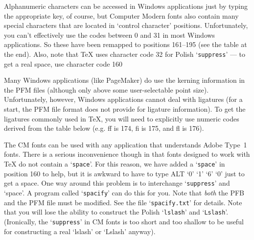 

Alphanumeric characters can be accessed in Windows applications just by
typing the appropriate key, of course, but Computer Modern fonts also contain
many special characters that are located in `control character' positions.
Unfortunately, you can't effectively use the codes between 0 and 31 in most
Windows applications.  
So these have been remapped to positions 161--195 (see the table at the end).  
Also, note that {\TeX} uses character code 32 for Polish
`{\tt suppress}' %
--- to get a real space, use character code 160

Many Windows applications (like PageMaker) do use the kerning
information in the PFM files (although only above some user-selectable
point size).  
Unfortunately, however, Windows applications cannot deal with ligatures
(for a start, the PFM file format does not provide for ligature information).
To get the ligatures commonly used in {\TeX}, you will need to
explicitly use numeric codes derived from the table below 
(e.g. ff is 174, fi is 175, and fl is 176). 


The CM fonts can be used with any application that understands 
Adobe Type~1 fonts. 
There is a serious inconvenience though in that %
fonts designed to work with {\TeX} 
do not contain a `{\tt space}'.  
For this reason, we have added a `{\tt space}' in position 160 to help,
but it is awkward to have to type ALT `0' `1' `6' `0' just to get a space.  
One way around this problem is to interchange `{\tt suppress}' and `space'.
A program called `{\tt spacify}' can do this for you.  
Note that {\it both} the PFB and the PFM file must be modified. 
See the file `{\tt spacify.txt}' for details.
Note that you will lose the ability to construct the
Polish `{\tt lslash}' and `{\tt Lslash}'.
(Ironically, the `{\tt suppress}' in CM fonts is too short and too shallow
to be useful for constructing a real `lslash' or `Lslash' anyway).


